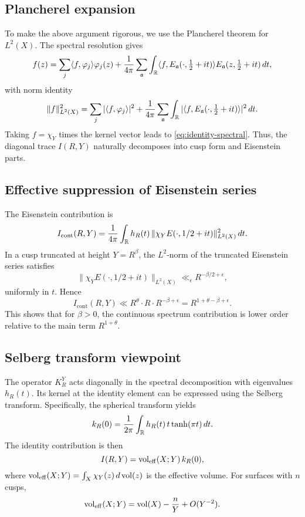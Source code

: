 \subsection{Plancherel expansion}\label{subsec:identity-plancherel}

To make the above argument rigorous, we use the Plancherel theorem for $L^2(X)$. The spectral resolution gives
\[
f(z) = \sum_j \langle f,\varphi_j\rangle\varphi_j(z) + \frac{1}{4\pi}\sum_{\mathfrak{a}}\int_{\mathbb{R}} \langle f, E_\mathfrak{a}(\cdot,\tfrac12+it)\rangle E_\mathfrak{a}(z,\tfrac12+it)\,dt,
\]
with norm identity
\[
\|f\|_{L^2(X)}^2 = \sum_j |\langle f,\varphi_j\rangle|^2 + \frac{1}{4\pi}\sum_\mathfrak{a}\int_{\mathbb{R}} |\langle f, E_\mathfrak{a}(\cdot,\tfrac12+it)\rangle|^2\,dt.
\]
Taking $f=\chi_Y$ times the kernel vector leads to \eqref{eq:identity-spectral}. Thus, the diagonal trace $I(R,Y)$ naturally decomposes into cusp form and Eisenstein parts.

\subsection{Effective suppression of Eisenstein series}\label{subsec:identity-eisenstein}

The Eisenstein contribution is
\[
I_{\text{cont}}(R,Y) = \frac{1}{4\pi}\int_{\mathbb{R}} h_R(t)\,\|\chi_Y E(\cdot,1/2+it)\|_{L^2(X)}^2\,dt.
\]
In a cusp truncated at height $Y=R^\beta$, the $L^2$-norm of the truncated Eisenstein series satisfies
\[
\|\chi_Y E(\cdot,1/2+it)\|_{L^2(X)} \ll_\epsilon R^{-\beta/2+\epsilon},
\]
uniformly in $t$. Hence
\[
I_{\text{cont}}(R,Y) \ll R^\theta \cdot R \cdot R^{-\beta+\epsilon} = R^{1+\theta-\beta+\epsilon}.
\]
This shows that for $\beta > 0$, the continuous spectrum contribution is lower order relative to the main term $R^{1+\theta}$.

\subsection{Selberg transform viewpoint}\label{subsec:identity-selberg}

The operator $K_R^Y$ acts diagonally in the spectral decomposition with eigenvalues $h_R(t)$. Its kernel at the identity element can be expressed using the Selberg transform. Specifically, the spherical transform yields
\[
k_R(0) = \frac{1}{2\pi}\int_{\mathbb{R}} h_R(t)\,t\tanh(\pi t)\,dt.
\]
The identity contribution is then
\[
I(R,Y) = \operatorname{vol}_{\mathrm{eff}}(X;Y)\,k_R(0),
\]
where $\operatorname{vol}_{\mathrm{eff}}(X;Y) = \int_X \chi_Y(z)\,d\operatorname{vol}(z)$ is the effective volume. For surfaces with $n$ cusps,
\[
\operatorname{vol}_{\mathrm{eff}}(X;Y) = \operatorname{vol}(X) - \frac{n}{Y} + O(Y^{-2}).
\]

